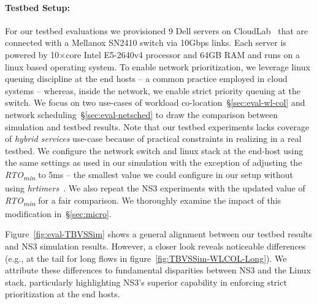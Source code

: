 \paragraph{Testbed Setup:}
For our testbed evaluations we provisioned 9 Dell servers on CloudLab~\cite{cloudlab} that are connected with a Mellanox SN2410 switch via 10Gbps links. Each server is powered by 10$\times$core Intel E5-2640v4 processor and 64GB RAM and runs on a linux based operating system. To enable network prioritization, we leverage linux queuing discipline at the end hosts -- a common practice employed in cloud systems -- whereas, inside the network, we enable strict priority queuing at the switch.
We focus on two use-cases of workload co-location~\S\ref{sec:eval-wl-col} and network scheduling~\S\ref{sec:eval-netsched} to draw the comparison between simulation and testbed results. Note that our testbed experiments lacks coverage of \emph{hybrid services} use-case because of practical constraints in realizing \nearopt{} in a real testbed. 
We configure the network switch and linux stack at the end-host using the same settings as used in our simulation with the exception of adjusting the \emph{RTO\textsubscript{min}} to 5ms -- the smallest value we could configure in our setup without using \emph{hrtimers}~\cite{hrtimer-sigcomm09}. We also repeat the NS3 experiments with the updated value of \emph{RTO\textsubscript{min}} for a fair comparison. We thoroughly examine the impact of this modification in~\S\ref{sec:micro}. 

Figure~\ref{fig:eval-TBVSSim} shows a general alignment between our testbed results and NS3 simulation results. However, a closer look reveals noticeable differences (e.g., at the tail for long flows in figure~\ref{fig:TBVSSim-WLCOL-Long}). We attribute these differences to fundamental disparities between NS3 and the Linux stack, particularly highlighting NS3's superior capability in enforcing strict prioritization at the end hosts. 